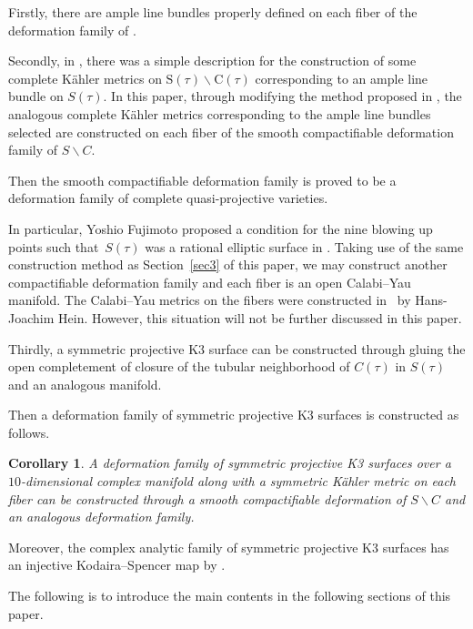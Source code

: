 \documentclass[10pt,a4paper]{amsart}
\numberwithin{equation}{section}
\newtheorem{Corollary}[Theorem]{Corollary}
\def\operatorname#1{#1}
\def\overline#1{#1}
\begin{document}
Firstly, there are ample line bundles properly defined on each fiber of the deformation family of \smash{$\operatorname{CP}^2 \#9\overline{\operatorname{CP}}^2$} \cite{Tomasz-Halszka}.

Secondly, in \cite{Takayuki-Takato2}, there was a simple description for the construction of some complete K\"ahler metrics on $\text{S}(\tau)\backslash \text{C}(\tau)$ corresponding to an ample line bundle on $S(\tau)$. In this paper, through modifying the method proposed in \cite{Takayuki-Takato2}, the analogous complete K\"ahler metrics corresponding to the ample line bundles selected are constructed on each fiber of the smooth compactifiable deformation family of $S \backslash C$.

Then the smooth compactifiable deformation family is proved to be a deformation family of complete quasi-projective varieties.

In particular, Yoshio Fujimoto proposed a condition for the nine blowing up points such that~$S(\tau)$ was a rational elliptic surface in \cite{Yoshio}. Taking use of the same construction method as Section~\ref{sec3} of this paper, we may construct another compactifiable deformation family and each fiber is an open Calabi--Yau manifold. The Calabi--Yau metrics on the fibers were constructed in~\cite{Hans} by Hans-Joachim Hein. However, this situation will not be further discussed in this paper.

Thirdly, a symmetric projective K3 surface can be constructed through gluing the open completement of closure of the tubular neighborhood of $C(\tau)$ in $S(\tau)$ and an analogous manifold.

Then a deformation family of symmetric projective K3 surfaces is constructed as follows.


\begin{Corollary} \label{Corollary1.2}
A deformation family of symmetric projective K3 surfaces over a $10$-dimensional complex manifold along with a symmetric K\"ahler metric on each fiber can be constructed through a smooth compactifiable deformation of $S \backslash C$ and an analogous deformation family.
\end{Corollary}


Moreover, the complex analytic family of symmetric projective K3 surfaces has an injective Kodaira--Spencer map by \cite[Theorem~1.1]{Takayuki-Takato1}.

The following is to introduce the main contents in the following sections of this paper.
\end{document}
